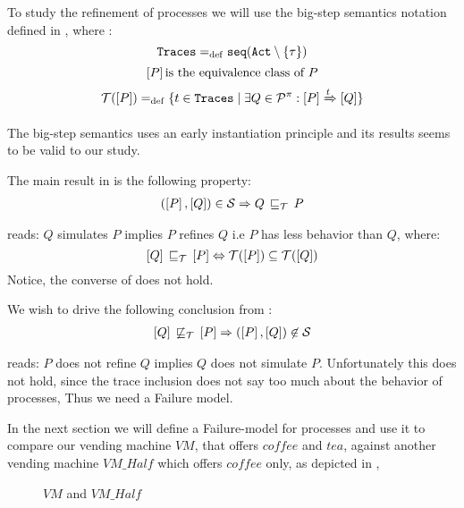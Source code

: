 To study the refinement of \picalc{} processes we will use the big-step semantics notation defined in \cite{gieseking}, where :
\[\tr \define \seqset{\actions\setminus\set{\tau}}\]
\[\ec{P} \text{is the equivalence class of}\ P\]
\[\traces[P] \define \{t\in \tr \mid \exists Q\in\procs: \ec{P} \bigstep{t} \ec{Q}\}\]

The big-step semantics uses an early instantiation principle and its results seems to be valid to our study.

The main result in \cite{gieseking} is the following property:
\begin{align}
    (\ec{P},\ec{Q})\in{}\simu \Rightarrow Q \refi P \label{property1}
\end{align}

 reads: $Q$ simulates $P$ implies $P$ refines $Q$ i.e $P$ has less behavior than $Q$, where:
\[\ec{Q}\refi \ec{P} \Leftrightarrow \traces[P]\subseteq\traces[Q]\]
Notice, the converse of  does not hold.

We wish to drive the following conclusion from : 
\begin{align}
    \ec{Q} \nrefi \ec{P} \Rightarrow (\ec{P},\ec{Q})\nin{}\simu\label{conc1}
\end{align}

 reads: $P$ does not refine $Q$ implies $Q$ does not simulate $P$. Unfortunately this does not hold, since the trace inclusion does not say too much about the behavior of processes, Thus we need a Failure model.

In the next section we will define a Failure-model for \picalc{} processes and use it to compare our vending machine $VM$, that offers $coffee$ and $tea$, against another vending machine $VM\_Half$ which offers $coffee$ only, as depicted in , 
\begin{figure}[H]%
\centering
{}%
\qquad
{}%
\caption{$VM$ and $VM\_Half$}
\label{vm_and_vmHalf}
\end{figure}


